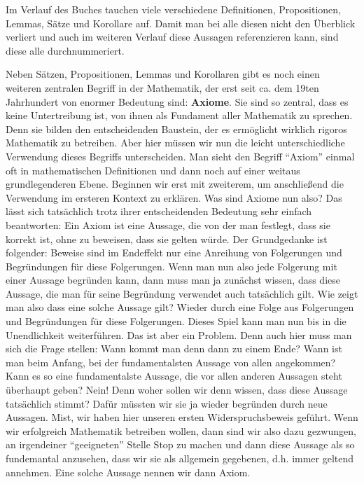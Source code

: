 \documentclass[11pt,reqno, a4paper]{book}
\renewcommand{\textbf}[1]{{\normalfont\bf #1}}
\theoremstyle{mystyle}
\theoremstyle{definition}
\numberwithin{equation}{chapter}
\begin{document}
Im Verlauf des Buches tauchen viele verschiedene Definitionen, Propositionen, Lemmas, Sätze und Korollare auf. Damit man bei alle diesen nicht den Überblick verliert und auch im weiteren Verlauf diese Aussagen referenzieren kann, sind diese alle durchnummeriert. 

Neben Sätzen, Propositionen, Lemmas und Korollaren gibt es noch einen weiteren zentralen Begriff in der Mathematik, der erst seit ca. dem 19ten Jahrhundert von enormer Bedeutung sind: \textbf{Axiome}. Sie sind so zentral, dass es keine Untertreibung ist, von ihnen als Fundament aller Mathematik zu sprechen. Denn sie bilden den entscheidenden Baustein, der es ermöglicht wirklich rigoros Mathematik zu betreiben. Aber hier müssen wir nun die leicht unterschiedliche Verwendung dieses Begriffs unterscheiden. Man sieht den Begriff "`Axiom"' einmal oft in mathematischen Definitionen und dann noch auf einer weitaus grundlegenderen Ebene. Beginnen wir erst mit zweiterem, um anschließend die Verwendung im ersteren Kontext zu erklären. Was sind Axiome nun also? Das lässt sich tatsächlich trotz ihrer entscheidenden Bedeutung sehr einfach beantworten: Ein Axiom ist eine Aussage, die von der man festlegt, dass sie korrekt ist, ohne zu beweisen, dass sie gelten würde. Der Grundgedanke ist folgender: Beweise sind im Endeffekt nur eine Anreihung von Folgerungen und Begründungen für diese Folgerungen. Wenn man nun also jede Folgerung mit einer Aussage begründen kann, dann muss man ja zunächst wissen, dass diese Aussage, die man für seine Begründung verwendet auch tatsächlich gilt. Wie zeigt man also dass eine solche Aussage gilt? Wieder durch eine Folge aus Folgerungen und Begründungen für diese Folgerungen. Dieses Spiel kann man nun bis in die Unendlichkeit weiterführen. Das ist aber ein Problem. Denn auch hier muss man sich die Frage stellen: Wann kommt man denn dann zu einem Ende? Wann ist man beim Anfang, bei der fundamentalsten Aussage von allen angekommen? Kann es so eine fundamentalste Aussage, die vor allen anderen Aussagen steht überhaupt geben? Nein! Denn woher sollen wir denn wissen, dass diese Aussage tatsächlich stimmt? Dafür müssten wir sie ja wieder begründen durch neue Aussagen. Mist, wir haben hier unseren ersten Widerspruchsbeweis geführt. Wenn wir erfolgreich Mathematik betreiben wollen, dann sind wir also dazu gezwungen, an irgendeiner "`geeigneten"' Stelle Stop zu machen und dann diese Aussage als so fundemantal anzusehen, dass wir sie als allgemein gegebenen, d.h. immer geltend annehmen. Eine solche Aussage nennen wir dann Axiom. 
\end{document}
